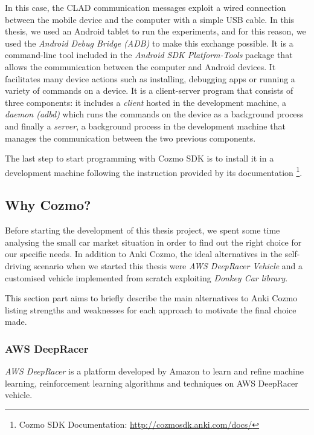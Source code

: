 In this case, the CLAD communication messages exploit a wired connection between the mobile device and the computer with a simple USB cable.
In this thesis, we used an Android tablet to run the experiments, and for this reason, we used the \textit{Android Debug Bridge (ADB)} to make this exchange possible.
It is a command-line tool included in the \textit{Android SDK Platform-Tools} package that allows the communication between the computer and Android devices.
It facilitates many device actions such as installing, debugging apps or running a variety of commands on a device.
It is a client-server program that consists of three components: it includes a \textit{client} hosted in the development machine, a \textit{daemon (adbd)} which runs the commands on the device as a background process and finally a \textit{server}, a background process in the development machine that manages the communication between the two previous components.

The last step to start programming with Cozmo SDK is to install it in a development machine following the instruction provided by its documentation \footnote{Cozmo SDK Documentation: \href{http://cozmosdk.anki.com/docs/index.html}{http://cozmosdk.anki.com/docs/}}.


\subsection{Why Cozmo?}

Before starting the development of this thesis project, we spent some time analysing the small car market situation in order to find out the right choice for our specific needs.
In addition to Anki Cozmo, the ideal alternatives in the self-driving scenario when we started this thesis were \textit{AWS DeepRacer Vehicle} and a customised vehicle implemented from scratch exploiting \textit{Donkey \textregistered
	Car library}.

This section part aims to briefly describe the main alternatives to Anki Cozmo listing strengths and weaknesses for each approach to motivate the final choice made.

\subsubsection{AWS DeepRacer}

\textit{AWS DeepRacer} is a platform developed by Amazon to learn and refine machine learning, reinforcement learning algorithms and techniques on AWS DeepRacer vehicle.


